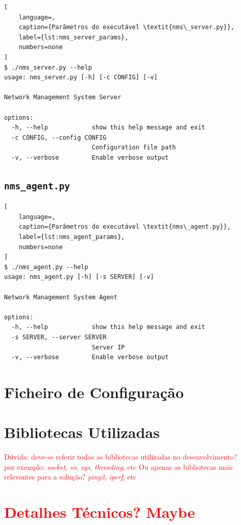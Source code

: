 \documentclass[a4paper,12pt]{scrreprt}
\begin{document}
\begin{lstlisting}[
    language=,
    caption={Parâmetros do executável \textit{nms\_server.py}},
    label={lst:nms_server_params},
    numbers=none
]
$ ./nms_server.py --help
usage: nms_server.py [-h] [-c CONFIG] [-v]

Network Management System Server

options:
  -h, --help            show this help message and exit
  -c CONFIG, --config CONFIG
                        Configuration file path
  -v, --verbose         Enable verbose output
\end{lstlisting}

\subsection{\texttt{nms\_agent.py}}

\begin{lstlisting}[
    language=,
    caption={Parâmetros do executável \textit{nms\_agent.py}},
    label={lst:nms_agent_params},
    numbers=none
]
$ ./nms_agent.py --help
usage: nms_agent.py [-h] [-s SERVER] [-v]

Network Management System Agent

options:
  -h, --help            show this help message and exit
  -s SERVER, --server SERVER
                        Server IP
  -v, --verbose         Enable verbose output
\end{lstlisting}

\section{Ficheiro de Configuração}

\section{Bibliotecas Utilizadas}

\textcolor{red}{
    Dúvida: deve-se referir todas as bibliotecas utilizadas no desenvolvimento? \\
    por exemplo: \textit{socket}, \textit{os}, \textit{sys}, \textit{threading}, etc
    Ou apenas as bibliotecas mais relevantes para a solução? \textit{ping3}, \textit{iperf}, etc
}

\section{\textcolor{red}{Detalhes Técnicos? Maybe}}
\end{document}
